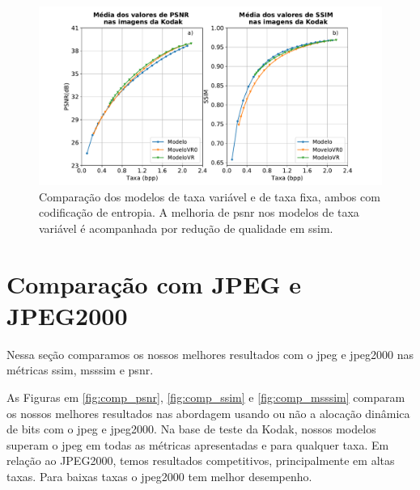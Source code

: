 \begin{figure}
	\centering
	\includegraphics[width=1.0\textwidth]{figuras/com_vr.pdf}
	\caption[Comparação dos modelos de taxa variável e taxa fixa.]{Comparação dos modelos de taxa variável e de taxa fixa, ambos com codificação de entropia. A melhoria de \acrshort{psnr} nos modelos de taxa variável é acompanhada por redução de qualidade em \acrshort{ssim}.}  	
	\label{fig:comp_vr}
\end{figure}

\section{Comparação com JPEG e JPEG2000}

Nessa seção comparamos os nossos melhores resultados com o \acrshort{jpeg} e \acrshort{jpeg}2000 nas métricas \acrshort{ssim}, \acrshort{msssim} e \acrshort{psnr}. 


As Figuras em \ref{fig:comp_psnr}, \ref{fig:comp_ssim} e \ref{fig:comp_msssim} comparam os nossos melhores resultados nas abordagem usando ou não a alocação dinâmica de bits com o \acrshort{jpeg} e \acrshort{jpeg}2000. Na base de teste da Kodak, nossos modelos superam o \acrshort{jpeg} em todas as métricas apresentadas e para qualquer taxa. Em relação ao JPEG2000, temos resultados competitivos, principalmente em altas taxas. Para baixas taxas o \acrshort{jpeg}2000 tem melhor desempenho.  



